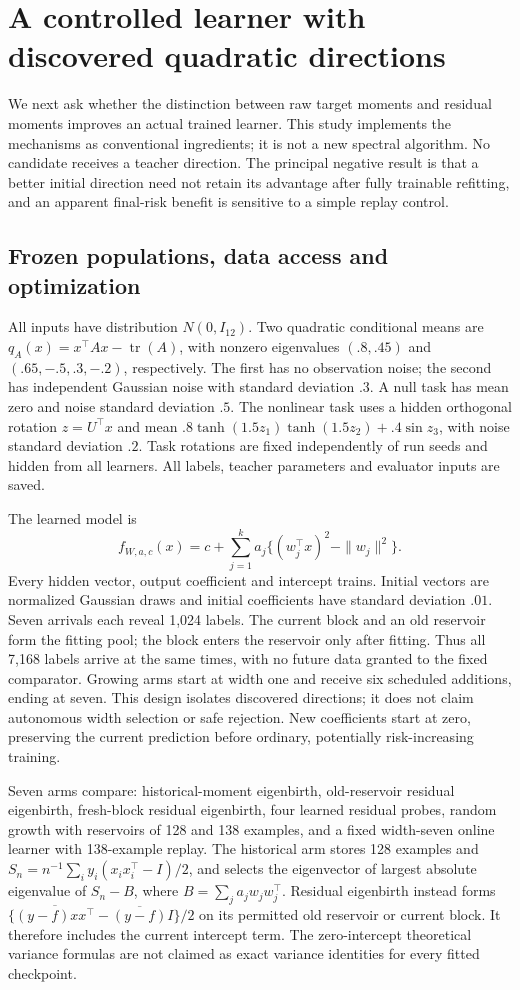 \section{A controlled learner with discovered quadratic directions}
\label{sec:experiments}

We next ask whether the distinction between raw target moments and residual
moments improves an actual trained learner. This study implements the
mechanisms as conventional ingredients; it is not a new spectral algorithm.
No candidate receives a teacher direction. The principal negative result is
that a better initial direction need not retain its advantage after fully
trainable refitting, and an apparent final-risk benefit is sensitive to a
simple replay control.

\subsection{Frozen populations, data access and optimization}
All inputs have distribution $N(0,I_{12})$. Two quadratic conditional means
are $q_A(x)=x^\top A x-\operatorname{tr}(A)$, with nonzero eigenvalues
$(.8,.45)$ and $(.65,-.5,.3,-.2)$, respectively. The first has no observation
noise; the second has independent Gaussian noise with standard deviation
$.3$. A null task has mean zero and noise standard deviation $.5$.
The nonlinear task uses a hidden orthogonal rotation $z=U^\top x$ and mean
$.8\tanh(1.5z_1)\tanh(1.5z_2)+.4\sin z_3$, with noise standard deviation
$.2$. Task rotations are fixed independently of run seeds and hidden from
all learners. All labels, teacher parameters and evaluator inputs are saved.

The learned model is
\[
 f_{W,a,c}(x)=c+\sum_{j=1}^k a_j\{(w_j^\top x)^2-\|w_j\|^2\}.
\]
Every hidden vector, output coefficient and intercept trains. Initial
vectors are normalized Gaussian draws and initial coefficients have standard
deviation $.01$. Seven arrivals each reveal 1,024 labels. The current block
and an old reservoir form the fitting pool; the block enters the reservoir
only after fitting. Thus all 7,168 labels arrive at the same times, with no
future data granted to the fixed comparator. Growing arms start at width
one and receive six scheduled additions, ending at seven. This design isolates
discovered directions; it does not claim autonomous width selection or safe
rejection. New coefficients start at zero, preserving the current prediction
before ordinary, potentially risk-increasing training.

Seven arms compare: historical-moment eigenbirth, old-reservoir residual
 eigenbirth, fresh-block residual eigenbirth, four learned residual probes,
random growth with reservoirs of 128 and 138 examples, and a fixed width-seven
online learner with 138-example replay. The historical arm stores 128 examples
and $S_n=n^{-1}\sum_i y_i(x_ix_i^\top-I)/2$, and selects the eigenvector of
largest absolute eigenvalue of $S_n-B$, where $B=\sum_j a_jw_jw_j^\top$.
Residual eigenbirth instead forms
$\{\overline{(y-f)x x^\top}-\overline{(y-f)}I\}/2$ on its permitted
old reservoir or current block. It therefore includes the current intercept
term. The zero-intercept theoretical variance formulas are not claimed as
exact variance identities for every fitted checkpoint.


